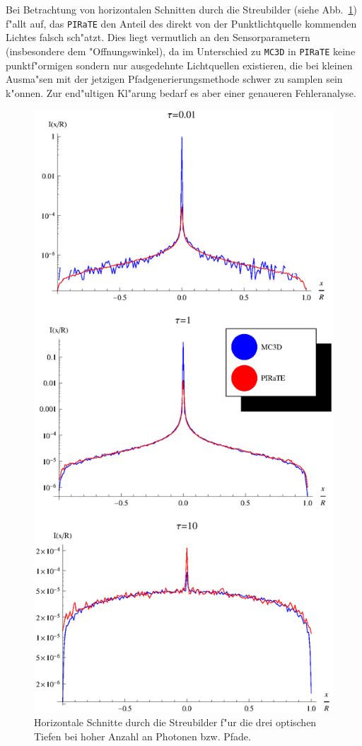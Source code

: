 	Bei Betrachtung von horizontalen Schnitten durch die Streubilder (siehe Abb.~\ref{fig:sphere_image_cuts}) f"allt auf, das \texttt{PIRaTE} den Anteil des direkt von der Punktlichtquelle kommenden Lichtes falsch sch"atzt. Dies liegt vermutlich an den Sensorparametern (insbesondere dem "Offnungswinkel), da im Unterschied zu \texttt{MC3D} in \texttt{PIRaTE} keine punktf"ormigen sondern nur ausgedehnte Lichtquellen existieren, die bei kleinen Ausma"sen mit der jetzigen Pfadgenerierungsmethode schwer zu samplen sein k"onnen. Zur end"ultigen Kl"arung bedarf es aber einer genaueren Fehleranalyse.
	
		\begin{figure}
			\centering
			\includegraphics[height=1.0\textheight]{sphere_image_cuts.eps}
			\caption{Horizontale Schnitte durch die Streubilder f"ur die drei optischen Tiefen bei hoher Anzahl an Photonen bzw. Pfade.}
			\label{fig:sphere_image_cuts}
		\end{figure}
	
